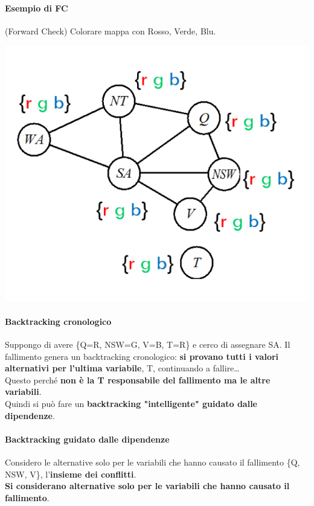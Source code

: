 \documentclass[10pt]{book}
\begin{document}
\paragraph{Esempio di FC} (Forward Check) Colorare mappa con Rosso, Verde, Blu.
\begin{center}
	\includegraphics[scale=0.7]{FC_es1.png}
\end{center}
\paragraph{Backtracking cronologico}
Suppongo di avere \{Q=R, NSW=G, V=B, T=R\} e cerco di assegnare SA. Il fallimento genera un backtracking cronologico: \textbf{si provano tutti i valori alternativi per l'ultima variabile}, T, continuando a fallire\ldots\\
Questo perché \textbf{non è la T responsabile del fallimento ma le altre variabili}.\\
Quindi si può fare un \textbf{backtracking "intelligente" guidato dalle dipendenze}.
\paragraph{Backtracking guidato dalle dipendenze} Considero le alternative solo per le variabili che hanno causato il fallimento \{Q, NSW, V\}, l'\textbf{insieme dei conflitti}.\\
\textbf{Si considerano alternative solo per le variabili che hanno causato il fallimento}.
\end{document}

